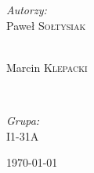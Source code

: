 \begin{titlepage}
\begin{center}
\begin{minipage}{0.4\textwidth}
\begin{flushleft} \large
\emph{Autorzy:}\\
Paweł \textsc{Sołtysiak}
\end{flushleft}
\end{minipage}
\begin{minipage}{0.4\textwidth}
\begin{flushright} \large
~\\
Marcin \textsc{Klepacki}
\end{flushright}
\end{minipage}
~\\[0.5cm]
\begin{minipage}{0.82\textwidth}
\begin{flushleft} \large
\emph{Grupa:}\\
\textsc{I1-31A}
\end{flushleft}
\end{minipage}


\vfill

{\large \today}

\end{center}
\end{titlepage}